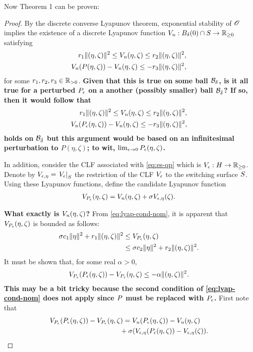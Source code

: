 \documentclass[twocolumn]{article}
\begin{document}
Now Theorem 1 can be proven:
\begin{proof}
  By the discrete converse Lyapunov theorem, exponential stability of $\Orbit$ implies the existence of a discrete Lyapunov function $\Vn : B_{\delta}(0) \cap \S \to \Rnn$ satisfying
  \begin{align}
    \nonumber
    r_{1} \| (\eta, \zeta) \|^{2} \leq \Vn(\eta, \zeta) \leq r_{2} \| (\eta, \zeta) \|^2,\\
    \Vn(\P(\eta, \zeta)) - \Vn(\eta, \zeta) \leq -r_{3} \| (\eta, \zeta) \|^{2},
    \label{eq:lyap-cond-nom}
  \end{align}
  for some $r_{1}, r_{2}, r_{3} \in \Rpd$.
  {\bf Given that this is true on some ball $\B_{\delta}$, is it all true for a perturbed $\Pe$ on a another (possibly smaller) ball $\B_{\bar \delta}$? If so, then it would follow that
  \begin{align}
    \nonumber
    r_{1} \| (\eta, \zeta) \|^{2} \leq \Vn(\eta, \zeta) \leq r_{2} \| (\eta, \zeta) \|^2,\\
    \Vn(\P_{\epsilon}(\eta, \zeta)) - \Vn(\eta, \zeta) \leq -r_{3} \| (\eta, \zeta) \|^{2},
    \label{eq:lyap-cond-nom}
  \end{align}
  holds on $\B_{\bar \delta}$ but this argument would be based on an infinitesimal perturbation to $P(\eta, \zeta)$; to wit, $\limeps \Pe(\eta, \zeta)$.}

  In addition, consider the CLF associated with \eqref{eq:es-qp} which is $\Ve : \Eta \to \Rnn$.
  Denote by $\Vee = \VeS$ the restriction of the CLF $\Ve$ to the switching surface $\S$.
  Using these Lyapunov functions, define the candidate Lyapunov function
  \begin{align}
    \VP(\eta, \zeta) = \Vn(\eta, \zeta) + \sigma \Vee(\zeta).
  \end{align}

  {\bf What exactly is $\Vn(\eta, \zeta)$?}
  From \eqref{eq:lyap-cond-nom}, it is apparent that $\VP(\eta, \zeta)$ is bounded as follows:
  \begin{align}
    \sigma c_{1} \| \eta \|^{2} + r_{1} \| (\eta, \zeta) \|^{2} &\leq \VP(\eta, \zeta)\\
    \nonumber
    &\leq \sigma c_{2} \| \eta \|^{2} + r_{2} \| (\eta, \zeta) \|^{2}.
  \end{align}
  It must be shown that, for some real $\alpha > 0$,
  \begin{align}
    \VP(\Pe(\eta, \zeta)) - \VP(\eta, \zeta) \leq -\alpha \| (\eta, \zeta) \|^{2}.
  \end{align}
      {\bf This may be a bit tricky because the second condition of \eqref{eq:lyap-cond-nom} does not apply since $\P$ must be replaced with $\Pe$.}
  First note that
  \begin{align}
    \lefteqn{\VP(\Pe(\eta, \zeta)) - \VP(\eta, \zeta) = \Vn(\Pe(\eta, \zeta)) - \Vn(\eta, \zeta)}\\
    \nonumber
    &&\hspace{3.2cm}\mbox{} + \sigma(\Vee(\Pe(\eta, \zeta)) - \Vee(\zeta)).
  \end{align}


\end{proof}
\end{document}

